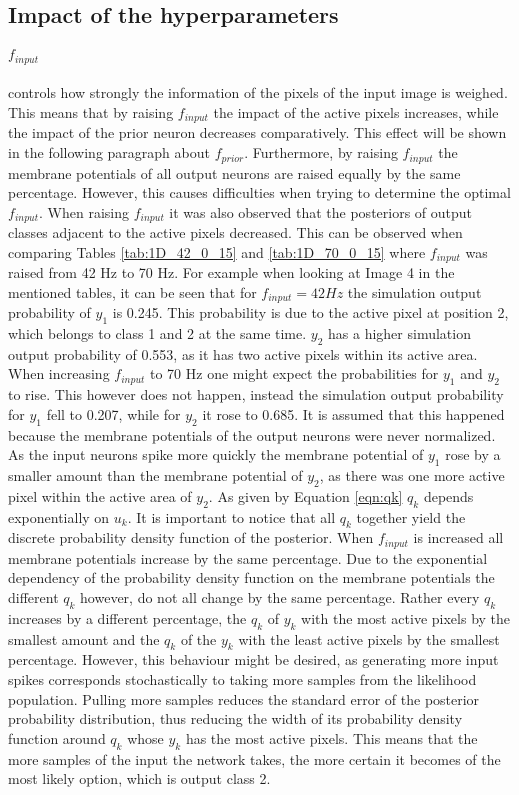 \subsection{Impact of the hyperparameters}
\label{subsection:impactHyper}
\paragraph{$f_{input}$} controls how strongly the information of the pixels of the input image is weighed. This means that by raising $f_{input}$ the impact of the active pixels increases, while the impact of the prior neuron decreases comparatively. This effect will be shown in the following paragraph about $f_{prior}$. Furthermore, by raising $f_{input}$ the membrane potentials of all output neurons are raised equally by the same percentage. However, this causes difficulties when trying to determine the optimal $f_{input}$. When raising $f_{input}$ it was also observed that the posteriors of output classes adjacent to the active pixels decreased. This can be observed when comparing Tables \ref{tab:1D_42_0_15} and \ref{tab:1D_70_0_15} where $f_{input}$ was raised from 42 Hz to 70 Hz. For example when looking at Image 4 in the mentioned tables, it can be seen that for $f_{input} = 42 Hz$ the simulation output probability of $y_1$ is 0.245. This probability is due to the active pixel at position 2, which belongs to class 1 and 2 at the same time. $y_2$ has a higher simulation output probability of 0.553, as it has two active pixels within its active area. When increasing $f_{input}$ to 70 Hz one might expect the probabilities for $y_1$ and $y_2$ to rise. This however does not happen, instead the simulation output probability for $y_1$ fell to 0.207, while for $y_2$ it rose to 0.685. It is assumed that this happened because the membrane potentials of the output neurons were never normalized. As the input neurons spike more quickly the membrane potential of $y_1$ rose by a smaller amount than the membrane potential of $y_2$, as there was one more active pixel within the active area of $y_2$. As given by Equation \ref{eqn:qk} $q_k$ depends exponentially on $u_k$. It is important to notice that all $q_k$ together yield the discrete probability density function of the posterior. When $f_{input}$ is increased all membrane potentials increase by the same percentage. Due to the exponential dependency of the probability density function on the membrane potentials the different $q_k$ however, do not all change by the same percentage. Rather every $q_k$ increases by a different percentage, the $q_k$ of $y_k$ with the most active pixels by the smallest amount and the $q_k$ of the $y_k$ with the least active pixels by the smallest percentage. However, this behaviour might be desired, as generating more input spikes corresponds stochastically to taking more samples from the likelihood population. Pulling more samples reduces the standard error of the posterior probability distribution, thus reducing the width of its probability density function around $q_k$ whose $y_k$ has the most active pixels. This means that the more samples of the input the network takes, the more certain it becomes of the most likely option, which is output class 2.

